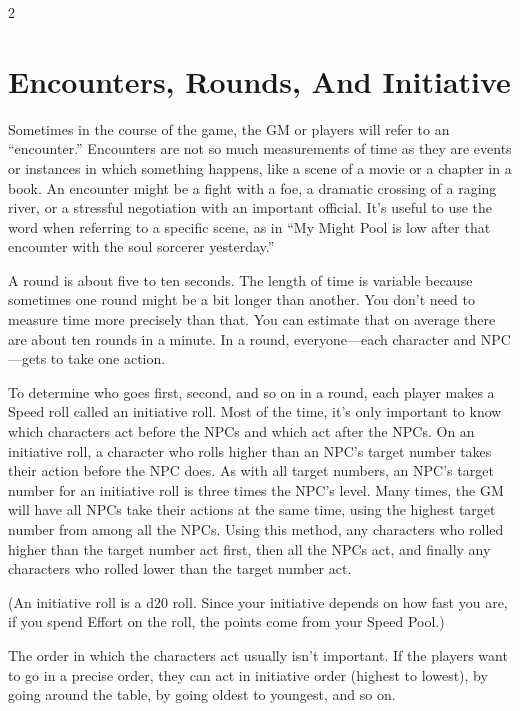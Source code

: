 \begin{multicols}{2}

\chapter{Encounters, Rounds, And Initiative}

Sometimes in the course of the game, the GM or players will refer to an “encounter.” Encounters are not so much measurements of time as they are events or instances in which something happens, like a scene of a movie or a chapter in a book. An encounter might be a fight with a foe, a dramatic crossing of a raging river, or a stressful negotiation with an important official. It’s useful to use the word when referring to a specific scene, as in “My Might Pool is low after that encounter with the soul sorcerer yesterday.”

A round is about five to ten seconds. The length of time is variable because sometimes one round might be a bit longer than another. You don’t need to measure time more precisely than that. You can estimate that on average there are about ten rounds in a minute. In a round, everyone—each character and NPC—gets to take one action.

To determine who goes first, second, and so on in a round, each player makes a Speed roll called an initiative roll. Most of the time, it’s only important to know which characters act before the NPCs and which act after the NPCs. On an initiative roll, a character who rolls higher than an NPC’s target number takes their action before the NPC does. As with all target numbers, an NPC’s target number for an initiative roll is three times the NPC’s level. Many times, the GM will have all NPCs take their actions at the same time, using the highest target number from among all the NPCs. Using this method, any characters who rolled higher than the target number act first, then all the NPCs act, and finally any characters who rolled lower than the target number act.

(An initiative roll is a d20 roll. Since your initiative depends on how fast you are, if you spend Effort on the roll, the points come from your Speed Pool.)

The order in which the characters act usually isn’t important. If the players want to go in a precise order, they can act in initiative order (highest to lowest), by going around the table, by going oldest to youngest, and so on.


\end{multicols}

